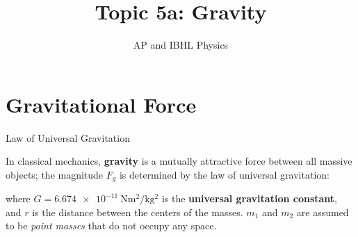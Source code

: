 \documentclass[12pt,compress,aspectratio=169]{beamer}
\title{Topic 5a: Gravity}
\subtitle{AP and IBHL Physics}
\begin{document}
\begin{frame}
  \maketitle
\end{frame}



\section{Gravitational Force}

\begin{frame}{Law of Universal Gravitation}
  \begin{center}
  \end{center}
  In classical mechanics, \textbf{gravity} is a mutually attractive force
  between all massive objects; the magnitude $F_g$ is determined by the law of
  universal gravitation:


  where $G=\SI{6.674e-11}{\newton\metre\squared\per\kilo\gram\squared}$ is the
  \textbf{universal gravitation constant}, and $r$ is the distance between the
  centers of the masses. $m_1$ and $m_2$ are assumed to be \emph{point masses}
  that do not occupy any space.
\end{frame}
\end{document}
